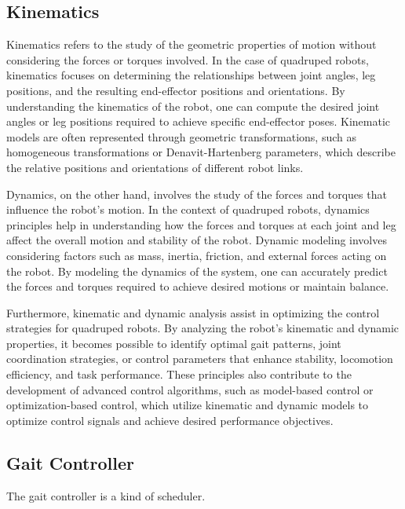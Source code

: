 \subsection{Kinematics}
Kinematics refers to the study of the geometric properties of motion without considering the forces or torques involved. In the case of quadruped robots, kinematics focuses on determining the relationships between joint angles, leg positions, and the resulting end-effector positions and orientations. By understanding the kinematics of the robot, one can compute the desired joint angles or leg positions required to achieve specific end-effector poses. Kinematic models are often represented through geometric transformations, such as homogeneous transformations or Denavit-Hartenberg parameters, which describe the relative positions and orientations of different robot links.

Dynamics, on the other hand, involves the study of the forces and torques that influence the robot's motion. In the context of quadruped robots, dynamics principles help in understanding how the forces and torques at each joint and leg affect the overall motion and stability of the robot. Dynamic modeling involves considering factors such as mass, inertia, friction, and external forces acting on the robot. By modeling the dynamics of the system, one can accurately predict the forces and torques required to achieve desired motions or maintain balance.

Furthermore, kinematic and dynamic analysis assist in optimizing the control strategies for quadruped robots. By analyzing the robot's kinematic and dynamic properties, it becomes possible to identify optimal gait patterns, joint coordination strategies, or control parameters that enhance stability, locomotion efficiency, and task performance. These principles also contribute to the development of advanced control algorithms, such as model-based control or optimization-based control, which utilize kinematic and dynamic models to optimize control signals and achieve desired performance objectives.

\subsection{Gait Controller}
The gait controller is a kind of scheduler. 

